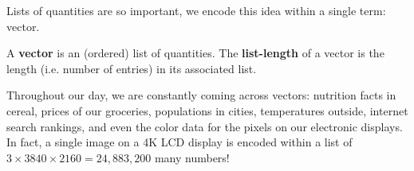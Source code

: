 Lists of quantities are so important, we encode this idea within a single term: vector.

\begin{Def}[Vector]
\label{def:vector}
A \textbf{vector} is an (ordered) list of quantities.  The \textbf{list-length} of a vector is the length (i.e. number of entries) in its associated list.
\end{Def}

\vspace{-1pc}
Throughout our day, we are constantly coming across vectors: nutrition facts in cereal, prices of our groceries, populations in cities, temperatures outside, internet search rankings, and even the color data for the pixels on our electronic displays.  In fact, a single image on a 4K LCD display is encoded within a list of $3\times 3840 \times 2160 = 24,883,200$ many numbers!
%



